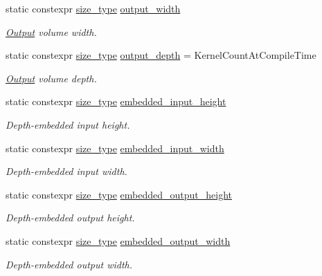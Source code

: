 \begin{DoxyCompactItemize}
static constexpr \hyperlink{namespaceffnn_a63b90a2fd70eb76684eac482a51633e5}{size\-\_\-type} \hyperlink{structffnn_1_1layer_1_1convolution_1_1options_a3d54e3e43cc0e955c4a64bcf6b5800d7}{output\-\_\-width}
\begin{DoxyCompactList}\small\item\em \hyperlink{classffnn_1_1layer_1_1_output}{Output} volume width. \end{DoxyCompactList}\item 
static constexpr \hyperlink{namespaceffnn_a63b90a2fd70eb76684eac482a51633e5}{size\-\_\-type} \hyperlink{structffnn_1_1layer_1_1convolution_1_1options_a7efc40f0f1fccd6267ac93acd9c3fe05}{output\-\_\-depth} = Kernel\-Count\-At\-Compile\-Time
\begin{DoxyCompactList}\small\item\em \hyperlink{classffnn_1_1layer_1_1_output}{Output} volume depth. \end{DoxyCompactList}\item 
static constexpr \hyperlink{namespaceffnn_a63b90a2fd70eb76684eac482a51633e5}{size\-\_\-type} \hyperlink{structffnn_1_1layer_1_1convolution_1_1options_a82e23d83d4ff1217b6aec5e49c94785e}{embedded\-\_\-input\-\_\-height}
\begin{DoxyCompactList}\small\item\em Depth-\/embedded input height. \end{DoxyCompactList}\item 
static constexpr \hyperlink{namespaceffnn_a63b90a2fd70eb76684eac482a51633e5}{size\-\_\-type} \hyperlink{structffnn_1_1layer_1_1convolution_1_1options_acd86e19ee6b983f31612e91f924abefa}{embedded\-\_\-input\-\_\-width}
\begin{DoxyCompactList}\small\item\em Depth-\/embedded input width. \end{DoxyCompactList}\item 
static constexpr \hyperlink{namespaceffnn_a63b90a2fd70eb76684eac482a51633e5}{size\-\_\-type} \hyperlink{structffnn_1_1layer_1_1convolution_1_1options_a9c39764ef9129a495aad4aed73bcd203}{embedded\-\_\-output\-\_\-height}
\begin{DoxyCompactList}\small\item\em Depth-\/embedded output height. \end{DoxyCompactList}\item 
static constexpr \hyperlink{namespaceffnn_a63b90a2fd70eb76684eac482a51633e5}{size\-\_\-type} \hyperlink{structffnn_1_1layer_1_1convolution_1_1options_a50aa15bb4c8e8b85748ad8485850e2ba}{embedded\-\_\-output\-\_\-width}
\begin{DoxyCompactList}\small\item\em Depth-\/embedded output width. \end{DoxyCompactList}\end{DoxyCompactItemize}


